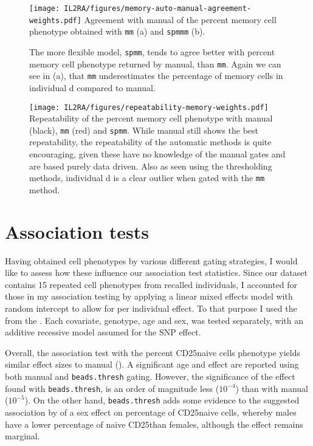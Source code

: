 \begin{figure}[h]
\centering
\texttt{[image: IL2RA/figures/memory-auto-manual-agreement-weights.pdf]}
{Agreement with manual of the percent memory cell phenotype obtained with \texttt{mm} (a) and \texttt{spmmm} (b).}
{
  The more flexible model, \texttt{spmm}, tends to agree better with percent memory cell phenotype returned by manual, than \texttt{mm}.
  Again we can see in (a), that \texttt{mm} underestimates the percentage of memory cells in individual d compared to
  manual.

}
\end{figure}



\begin{figure}[h]
\centering
  \texttt{[image: IL2RA/figures/repeatability-memory-weights.pdf]}
{Repeatability of the percent memory cell phenotype with manual (black), \texttt{mm} (red) and \texttt{spmm}.}
{
  While manual still shows the best repeatability, the repeatability of the automatic methods is quite encouraging, given
  these have no knowledge of the manual gates and are based purely data driven.
  Also as seen using the thresholding methods, individual d is a clear outlier when gated with the \texttt{mm} method.
}
\end{figure}




\section{Association tests}

Having obtained cell phenotypes by various different gating strategies, 
I would like to assess how these influence our association test statistics.
Since our dataset contains 15 repeated cell phenotypes from recalled individuals,
I accounted for those in my association testing 
by applying a linear mixed effects model with random intercept to allow for per individual effect.
To that purpose I used the  from the .
Each covariate, genotype, age and sex, was tested separately, with an additive recessive model assumed for the SNP effect.

Overall, the association test with the percent CD25\positive naive cells phenotype yields similar effect sizes to manual ().
A significant age and  effect are reported using both manual and \texttt{beads.thresh} gating.
However, the significance of the  effect found with \texttt{beads.thresh}, is an order of magnitude less ($10^{-4}$) than with manual ($10^{-5}$).
On the other hand, \texttt{beads.thresh} adds some evidence to the suggested association by \citet{Dendrou:2009dv} of a sex effect on percentage of CD25\positive naive cells,
whereby males have a lower percentage of naive CD25\positive than females, although the effect remains marginal.

